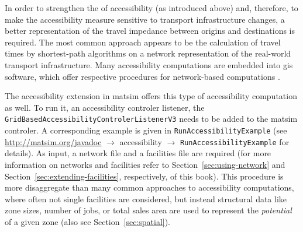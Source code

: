 

In order to strengthen the  of accessibility (as introduced above) and, therefore, to 
make the accessibility measure sensitive to transport infrastructure changes, a better representation of the travel 
impedance between origins and destinations is required. The most common approach appears to be the calculation of 
travel times by shortest-path algorithms on a network representation of the real-world transport infrastructure.
Many accessibility computations are embedded into \gls{gis} software, which offer respective procedures for network-based 
computations 
\citep{BBSRErreichbarkeitsmodell, CurtisEtAl2013AccessibilityPolicyInnovation, BuettnerEtAl2010Erreichbarkeitsatlas}.

%

The accessibility extension in \gls{matsim} offers this type of accessibility computation as well. To run it, an 
accessibility controler listener, \eg the \lstinline{GridBasedAccessibilityControlerListenerV3} needs to be added to 
the \gls{matsim} controler. A corresponding example is given in \lstinline{RunAccessibilityExample} (see
\url{http://matsim.org/javadoc} $\to$ accessibility $\to$ \lstinline{RunAccessibilityExample} for details). As input, a 
network file and a facilities file are required (for more information on networks and facilities refer to 
Section~\ref{sec:using-network} and Section~\ref{sec:extending-facilities}, respectively, of this book).
This procedure is more disaggregate than many common approaches to accessibility computations, where often not single 
facilities are considered, but instead structural data like zone sizes, number of jobs, or total sales area are used to 
represent the \emph{potential} of a given zone 
\citep{BuettnerEtAl2010Erreichbarkeitsatlas, GulhanEtAl2014PotentialAccessibilityMeasureDenizli} (also see
Section~\ref{sec:spatial}).

